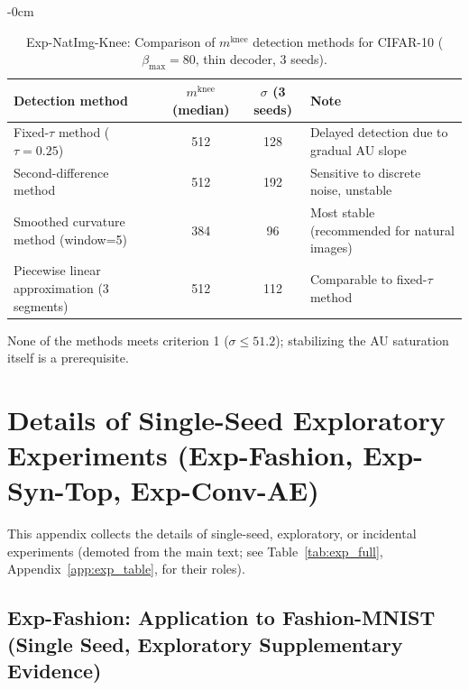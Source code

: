 \documentclass[make,article,submit,pdftex,moreauthors]{Definitions/mdpi}
\newcommand{\mknee}{m^{\mathrm{knee}}}
\begin{document}
\begin{table}[H]
\begin{adjustwidth}{-\extralength}{0cm}
\centering
\caption{Exp-NatImg-Knee: Comparison of $\mknee$ detection methods for CIFAR-10 ($\beta_\mathrm{max}=80$, thin decoder, 3 seeds).}
\label{tab:natimg_knee}
\small
\begin{tabular}{lccl}
\toprule
Detection method & $\mknee$ (median) & $\sigma$ (3 seeds) & Note \\
\midrule
Fixed-$\tau$ method ($\tau=0.25$) & 512 & 128 & Delayed detection due to gradual AU slope \\
Second-difference method & 512 & 192 & Sensitive to discrete noise, unstable \\
Smoothed curvature method (window=5) & 384 & 96 & Most stable (recommended for natural images) \\
Piecewise linear approximation (3 segments) & 512 & 112 & Comparable to fixed-$\tau$ method \\
\bottomrule
\end{tabular}
\end{adjustwidth}
\end{table}

None of the methods meets criterion 1 ($\sigma \leq 51.2$); stabilizing the AU saturation itself is a prerequisite.

\section[\appendixname~\thesection]{Details of Single-Seed Exploratory Experiments (Exp-Fashion, Exp-Syn-Top, Exp-Conv-AE)}\label{app:fashion}

This appendix collects the details of single-seed, exploratory, or incidental
experiments (demoted from the main text; see Table~\ref{tab:exp_full},
Appendix~\ref{app:exp_table}, for their roles).

\subsection*{Exp-Fashion: Application to Fashion-MNIST (Single Seed, Exploratory Supplementary Evidence)}
\end{document}
